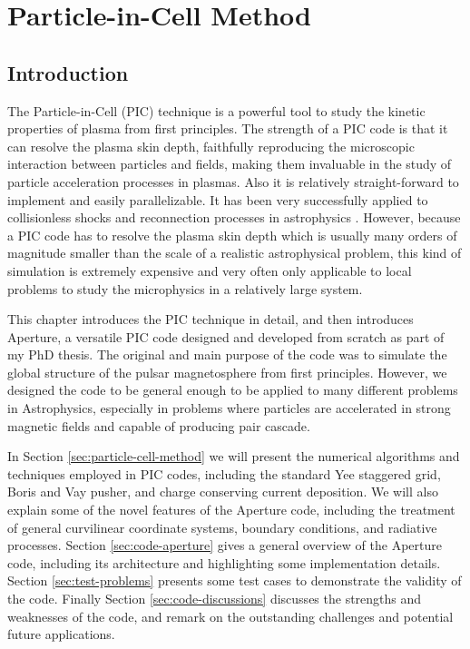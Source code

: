
\chapter{Particle-in-Cell Method}
\label{chap:pic}

\section{Introduction}
\label{sec:introduction}

The Particle-in-Cell (PIC) technique is a powerful tool to study the kinetic
properties of plasma from first principles. The strength of a PIC code is that
it can resolve the plasma skin depth, faithfully reproducing the microscopic
interaction between particles and fields, making them invaluable in the study of
particle acceleration processes in plasmas. Also it is relatively
straight-forward to implement and easily parallelizable. It has been very
successfully applied to collisionless shocks and reconnection processes in
astrophysics
. However, because a PIC code has to resolve the
plasma skin depth which is usually many orders of magnitude smaller than the
scale of a realistic astrophysical problem, this kind of simulation is extremely
expensive and very often only applicable to local problems to study the
microphysics in a relatively large system.

This chapter introduces the PIC technique in detail, and then introduces
Aperture, a versatile PIC code designed and developed from scratch as part of my
PhD thesis. The original and main purpose of the code was to simulate the global
structure of the pulsar magnetosphere from first principles. However, we
designed the code to be general enough to be applied to many different problems
in Astrophysics, especially in problems where particles are accelerated in
strong magnetic fields and capable of producing pair cascade.

In Section \ref{sec:particle-cell-method} we will present the numerical
algorithms and techniques employed in PIC codes, including the standard Yee
staggered grid, Boris and Vay pusher, and charge conserving current deposition.
We will also explain some of the novel features of the Aperture code, including
the treatment of general curvilinear coordinate systems, boundary conditions,
and radiative processes. Section \ref{sec:code-aperture} gives a general
overview of the Aperture code, including its architecture and highlighting some
implementation details. Section \ref{sec:test-problems} presents some test cases
to demonstrate the validity of the code. Finally Section
\ref{sec:code-discussions} discusses the strengths and weaknesses of the code,
and remark on the outstanding challenges and potential future applications.

